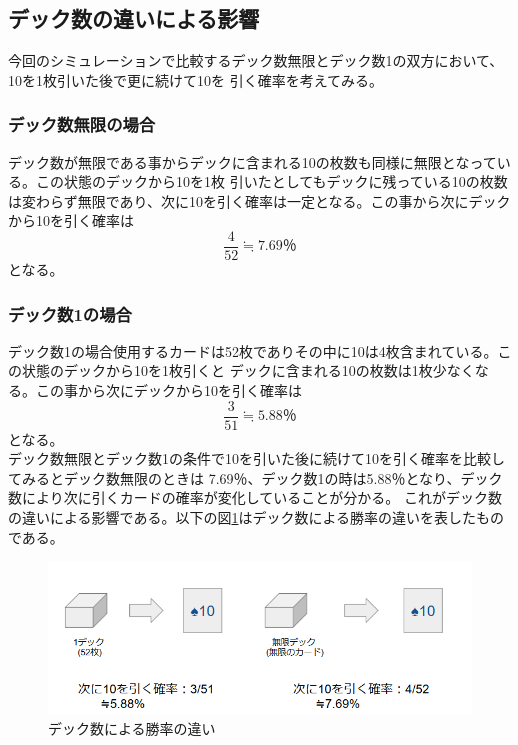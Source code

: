 
\subsection{デック数の違いによる影響}
今回のシミュレーションで比較するデック数無限とデック数1の双方において、10を1枚引いた後で更に続けて10を
引く確率を考えてみる。
\subsubsection{デック数無限の場合}
デック数が無限である事からデックに含まれる10の枚数も同様に無限となっている。この状態のデックから10を1枚
引いたとしてもデックに残っている10の枚数は変わらず無限であり、次に10を引く確率は一定となる。この事から次にデックから10を引く確率は\begin{equation}\frac{4}{52} \fallingdotseq 7.69％\end{equation}となる。\\
\subsubsection{デック数1の場合}
デック数1の場合使用するカードは52枚でありその中に10は4枚含まれている。この状態のデックから10を1枚引くと
デックに含まれる10の枚数は1枚少なくなる。この事から次にデックから10を引く確率は\begin{equation}\frac{3}{51}\fallingdotseq5.88％\end{equation}となる。\\
デック数無限とデック数1の条件で10を引いた後に続けて10を引く確率を比較してみるとデック数無限のときは
7.69％、デック数1の時は5.88％となり、デック数により次に引くカードの確率が変化していることが分かる。
これがデック数の違いによる影響である。以下の図\ref{hogehoge}はデック数による勝率の違いを表したもの
である。

\begin{figure}[H]
\begin{center}

 \includegraphics[width=0.7\linewidth]{./figure/DeckDiff.PNG}
 \caption{デック数による勝率の違い \label{hogehoge}}
\end{center}
\end{figure}

